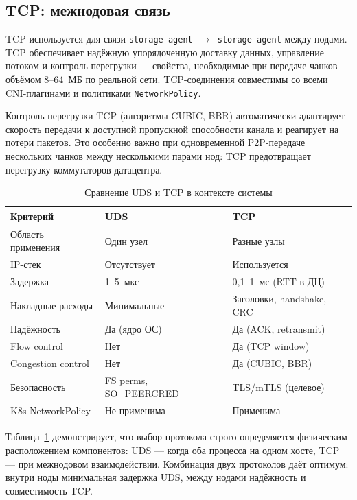\subsection*{TCP: межнодовая связь}

TCP используется для связи \texttt{storage-agent $\to$ storage-agent} между нодами. TCP обеспечивает надёжную упорядоченную доставку данных, управление потоком и контроль перегрузки --- свойства, необходимые при передаче чанков объёмом 8--64~МБ по реальной сети. TCP-соединения совместимы со всеми CNI-плагинами и политиками \texttt{NetworkPolicy}.

Контроль перегрузки TCP (алгоритмы CUBIC, BBR) автоматически адаптирует скорость передачи к доступной пропускной способности канала и реагирует на потери пакетов. Это особенно важно при одновременной P2P-передаче нескольких чанков между несколькими парами нод: TCP предотвращает перегрузку коммутаторов датацентра.

\begin{table}[htbp]
\centering
\caption{Сравнение UDS и TCP в контексте системы}
\label{tab:uds_tcp}
\begin{tabularx}{\textwidth}{p{52mm}Xp{52mm}}
\toprule
\textbf{Критерий} & \textbf{UDS} & \textbf{TCP} \\
\midrule
Область применения     & Один узел                & Разные узлы \\
IP-стек                & Отсутствует              & Используется \\
Задержка               & 1--5~мкс                 & 0,1--1~мс (RTT в ДЦ) \\
Накладные расходы      & Минимальные              & Заголовки, handshake, CRC \\
Надёжность             & Да (ядро ОС)             & Да (ACK, retransmit) \\
Flow control           & Нет                      & Да (TCP window) \\
Congestion control     & Нет                      & Да (CUBIC, BBR) \\
Безопасность           & FS perms, SO\_PEERCRED   & TLS/mTLS (целевое) \\
K8s NetworkPolicy      & Не применима             & Применима \\
\bottomrule
\end{tabularx}
\end{table}

Таблица~\ref{tab:uds_tcp} демонстрирует, что выбор протокола строго определяется физическим расположением компонентов: UDS --- когда оба процесса на одном хосте, TCP --- при межнодовом взаимодействии. Комбинация двух протоколов даёт оптимум: внутри ноды минимальная задержка UDS, между нодами надёжность и совместимость TCP.

